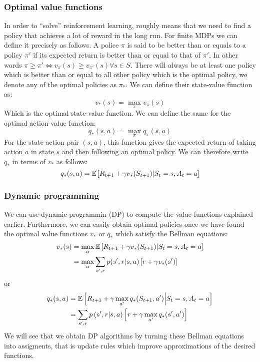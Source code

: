     \subsubsection{Optimal value functions}
    In order to ``solve'' reinforcement learning, roughly means that we need to 
    find a policy that achieves a lot of reward in the long run. For finite 
    MDPs we can define it precisely as follows. A police $\pi$ is said to be 
    better than or equals to a policy $\pi'$ if its expected return is better 
    than or equal to that of $\pi'$. In other words $\pi \geq \pi' \iff 
    v_\pi(s)\geq v_{\pi'}(s) \forall s\in S$. There will always be at least one 
    policy which is better than or equal to all other policy which is the 
    optimal policy, we denote any of the optimal policies as $\pi_*$. We can 
    define their state-value function as:
    \begin{equation*}
        v_*(s)=\max_\pi v_\pi(s)
    \end{equation*}
    Which is the optimal state-value function. We can define the same for the 
    optimal action-value function:
    \begin{equation*}
        q_*(s,a)=\max_\pi q_\pi(s,a)
    \end{equation*}
    For the state-action pair $(s,a)$, this function gives the expected return 
    of taking action $a$ in state $s$ and then following an optimal policy. We 
    can therefore write $q_*$ in terms of $v_*$ as follows:
    \begin{equation*}
        q_*(s,a)=\mathbb{E}\left[R_{t+1}+\gamma v_*(S_{t+1}) \middle\vert S_t=s, A_t=a\right]
    \end{equation*}
    
    \subsubsection{Dynamic programming}
    We can use dynamic programmin (DP) to compute the value functions explained 
    earlier. Furthermore, we can easily obtain optimal policies once we have 
    found the optimal value functions $v_*$ or $q_*$ which satisfy the Bellman 
    equations:
    \begin{align*}
        v_*(s)&=\max_a \mathbb{E}\left[R_{t+1}+\gamma v_*(S_{t+1}) \middle\vert S_t=s, A_t = 
        a\right]\\
            &= \max_a \sum_{s',r}p(s',r|s,a)\left[r+\gamma v_*(s')\right]
    \end{align*}
    or
    \begin{align*}
        q_*(s,a) &= \mathbb{E}\left[R_{t+1}+\gamma \max_{a'}q_*(S_{t+1},a') \middle\vert 
        S_t=s, A_t=a \right]\\
            &= \sum_{s', r}p\left(s', r \middle\vert s,a\right)\left[r+\gamma 
            \max_{a'}q_*(s',a')\right]
    \end{align*}
    We will see that we obtain DP algorithms by turning these Bellman equations 
    into assigments, that is update rules which improve approximations of the 
    desired functions.
    
